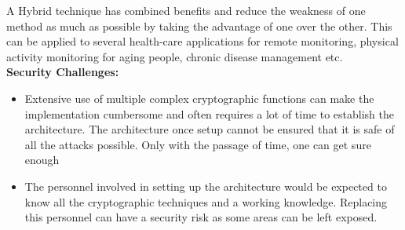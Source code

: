 \documentclass[letterpaper, 10 pt, conference]{ieeeconf}  %
\begin{document}
A Hybrid technique has combined benefits and reduce the weakness of one method as much as possible by taking the advantage of one over the other. This can be applied to several health-care applications for remote monitoring, physical activity monitoring for aging people, chronic disease management etc.\\
\textbf{Security Challenges:}
\begin{itemize}
\item Extensive use of multiple complex cryptographic functions can make the implementation cumbersome and often requires a lot of time to establish the architecture. The architecture once setup cannot be ensured that it is safe of all the attacks possible. Only with the passage of time, one can get sure enough
\item The personnel involved in setting up the architecture would be expected to know all the cryptographic techniques and a working knowledge. Replacing this personnel can have a security risk as some areas can be left exposed.
\end{itemize}
\end{document}
